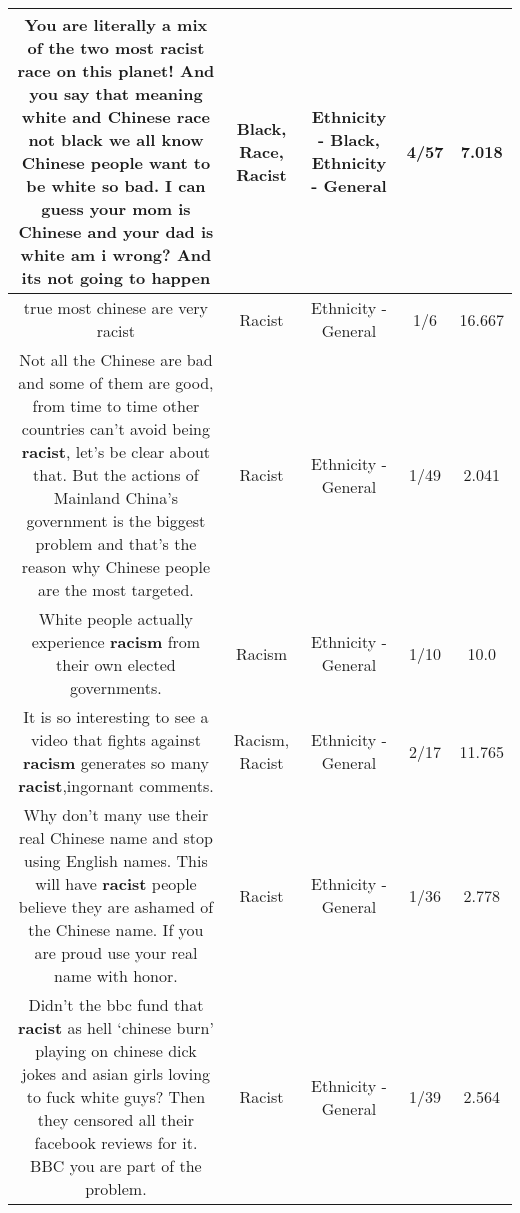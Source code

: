 \documentclass[11pt]{article}
\newlength\mylength
\begin{document}
\begin{center}
\begin{longtable}{|C{.65\mylength}|C{.30\mylength}|C{.12\mylength}|C{.12\mylength}|C{.12\mylength}|}
  \small You are literally a mix of the two most \textbf{racist} \textbf{race} on this planet! And you say that meaning white and Chinese \textbf{race} not \textbf{black} we all know Chinese people want to be white so bad. I can guess your mom is Chinese and your dad is white am i wrong? And its not going to happen\normalsize   & Black, Race, Racist & Ethnicity - Black, Ethnicity - General & 4/57 & 7.018 \\  \hline
  \small true most chinese are very racist\normalsize   & Racist & Ethnicity - General & 1/6 & 16.667 \\  \hline
  \small Not all the Chinese are bad and some of them are good,  from time to time other countries can't avoid being \textbf{racist}, let's be clear about that. But the actions of Mainland China's government is the biggest problem and that's the reason why Chinese people are the most targeted.\normalsize   & Racist & Ethnicity - General & 1/49 & 2.041 \\  \hline
  \small White people actually experience \textbf{racism} from their own elected governments.\normalsize   & Racism & Ethnicity - General & 1/10 & 10.0 \\  \hline
  \small It is so interesting to see a video that fights against \textbf{racism} generates so many \textbf{racist},ingornant comments.\normalsize   & Racism, Racist & Ethnicity - General & 2/17 & 11.765 \\  \hline
  \small Why don't many use their real Chinese name and stop using English names. This will have \textbf{racist} people believe they are ashamed of the Chinese name. If you are proud use your real name with honor.\normalsize   & Racist & Ethnicity - General & 1/36 & 2.778 \\  \hline
  \small Didn't the bbc fund that \textbf{racist} as hell ‘chinese burn' playing on chinese dick jokes and asian girls loving to fuck white guys? Then they censored all their facebook reviews for it. BBC you are part of the problem.\normalsize   & Racist & Ethnicity - General & 1/39 & 2.564 \\  \hline

\end{longtable}
\end{center}
\end{document}
